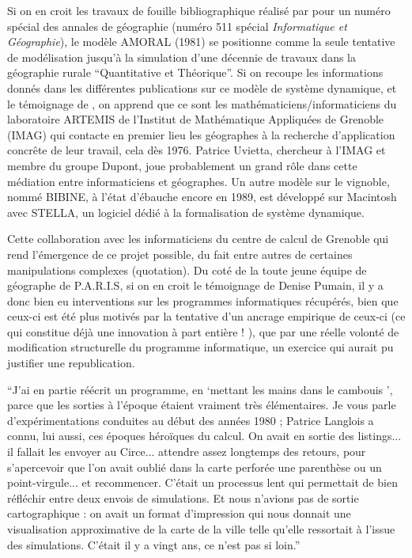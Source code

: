 Si on en croit les travaux de fouille bibliographique réalisé par \textcite{Rey1983} pour un numéro  spécial des annales de géographie (numéro 511 spécial \textit{Informatique et Géographie}), le modèle AMORAL (1981) se positionne comme la seule tentative de modélisation jusqu'à la simulation d'une décennie de travaux dans la géographie rurale \enquote{Quantitative et Théorique}. Si on recoupe les informations donnés dans les différentes publications sur ce modèle de système dynamique, et le témoignage de \textcite{LeBerre1987}, on apprend que ce sont les mathématiciens/informaticiens du laboratoire ARTEMIS de l’Institut de Mathématique Appliquées de Grenoble (IMAG) qui contacte en premier lieu les géographes à la recherche d’application concrête de leur travail, cela dès 1976. Patrice Uvietta, chercheur à l'IMAG et membre du groupe Dupont, joue probablement un grand rôle dans cette médiation entre informaticiens et géographes. Un autre modèle sur le vignoble, nommé BIBINE, à l'état d'ébauche encore en 1989, est développé sur Macintosh avec STELLA, un logiciel dédié à la formalisation de système dynamique. \autocite{Chamussy1989}

Cette collaboration avec les informaticiens du centre de calcul de Grenoble qui rend l’émergence de ce projet possible, du fait entre autres de certaines manipulations complexes (quotation). Du coté de la toute jeune équipe de géographe de P.A.R.I.S, si on en croit le témoignage de Denise Pumain, il y a donc bien eu interventions sur les programmes informatiques récupérés, bien que ceux-ci est été plus motivés par la tentative d’un ancrage empirique de ceux-ci (ce qui constitue déjà une innovation à part entière ! \autocite{Pumain1982} ), que par une réelle volonté de modification structurelle du programme informatique, un exercice qui aurait pu justifier une republication.

\enquote{J’ai en partie réécrit un programme, en \enquote{mettant les mains dans le cambouis }, parce que les sorties à l’époque étaient vraiment très élémentaires. Je vous parle d’expérimentations conduites au début des années 1980 ; Patrice Langlois a connu, lui aussi, ces époques héroïques du calcul. On avait en sortie des listings... il fallait les envoyer au Circe... attendre assez longtemps des retours, pour s’apercevoir que l’on avait oublié dans la carte perforée une parenthèse ou un point-virgule... et recommencer. C’était un processus lent qui permettait de bien réfléchir entre deux envois de simulations. Et nous n’avions pas de sortie cartographique : on avait un format d’impression qui nous donnait une visualisation approximative de la carte de la ville telle qu’elle ressortait à l’issue des simulations. C’était il y a vingt ans, ce n’est pas si loin.} \autocite[154]{Mathieu2014}

